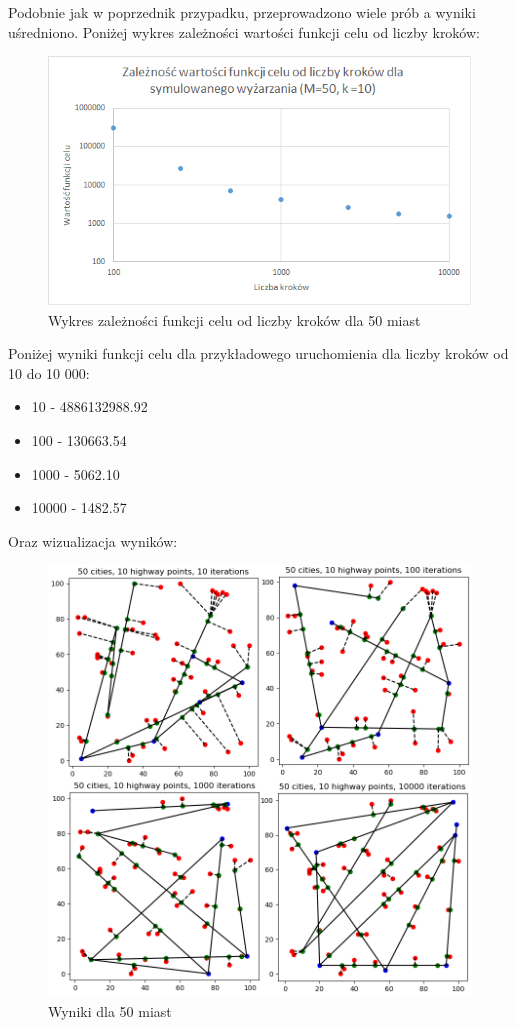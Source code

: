 \documentclass[a4paper]{article}
\begin{document}
Podobnie jak w poprzednik przypadku, przeprowadzono wiele prób a wyniki uśredniono. Poniżej wykres zależności wartości funkcji celu od liczby kroków:
\begin{figure}[h!]
\centering
\includegraphics[width=12cm]{50_cities_wykres}
\caption{Wykres zależności funkcji celu od liczby kroków dla 50 miast}
\label{fig:wyk50}
\end{figure}

Poniżej wyniki funkcji celu dla przykładowego uruchomienia dla liczby kroków od 10 do 10 000:
\begin{itemize}
\item 10 - 4886132988.92
\item 100 - 130663.54
\item 1000 - 5062.10
\item 10000 - 1482.57
\end{itemize}

Oraz wizualizacja wyników:
\begin{figure}[h!]
\centering
\includegraphics[width=12cm]{50_cities}
\caption{Wyniki dla 50 miast}
\end{figure}
\end{document}
